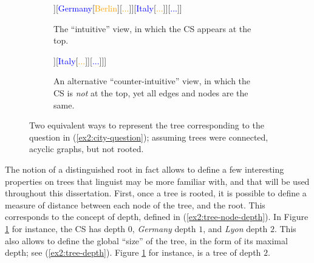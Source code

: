 \begin{figure}[H]
	\centering
	\begin{subfigure}[t]{.45\linewidth}
		\centering
		\begin{forest}
			[{CS\\
				Jo grew up in...}[\textcolor{blue}{France}[\textcolor{orange}{{Paris}}][\textcolor{orange}{Lyon}][\textcolor{orange}{...}]][\textcolor{blue}{Germany}[\textcolor{orange}{Berlin}][\textcolor{orange}{...}]][\textcolor{blue}{Italy}[\textcolor{orange}{...}]][\textcolor{blue}{...}]]
		\end{forest}
		\caption{The ``intuitive'' view, in which the CS appears at the top.}\label{fig2:city-tree-repeated}
	\end{subfigure}
	\hfill
	\begin{subfigure}[t]{.45\linewidth}
		\centering
		\begin{forest}
			[\textcolor{blue}{France}[\textcolor{orange}{Paris}][\textcolor{orange}{Lyon}][\textcolor{orange}{...}][CS[\textcolor{blue}{Germany}[\textcolor{orange}{Berlin}][\textcolor{orange}{...}]][\textcolor{blue}{Italy}[\textcolor{orange}{...}]][\textcolor{blue}{...}]]]
		\end{forest}
		\caption{An alternative ``counter-intuitive'' view, in which the CS is \textit{not} at the top, yet all edges and nodes are the same.}\label{fig2:city-tree-france-root}
	\end{subfigure}
	\caption{Two equivalent ways to represent the tree corresponding to the question in (\ref{ex2:city-question}); assuming trees were connected, acyclic graphs, but not rooted.}
\end{figure}


The notion of a distinguished root in fact allows to define a few interesting properties on trees that linguist may be more familiar with, and that will be used throughout this dissertation. First, once a tree is rooted, it is possible to define a measure of distance between each node of the tree, and the root. This corresponds to the concept of depth, defined in (\ref{ex2:tree-node-depth}). In Figure \ref{fig2:city-tree-repeated} for instance, the CS has depth $0$, \textit{Germany} depth $1$, and \textit{Lyon} depth $2$. This also allows to define the global ``size'' of the tree, in the form of its maximal depth; see (\ref{ex2:tree-depth}). Figure \ref{fig2:city-tree-repeated} for instance, is a tree of depth $2$.


